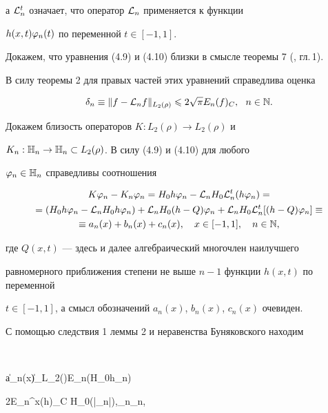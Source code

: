а ${\cal L}_n^t$ означает, что оператор ${\cal L}_n$ применяется к функции 


$h(x,t)\varphi_n(t)$ по переменной $t\in [-1,1]$.





Докажем, что уравнения (4.9) и (4.10) близки в смысле теоремы 7 (\cite{3}, гл.\,1). 


В силу теоремы 2 для правых частей этих уравнений справедлива оценка


\begin{equation}


\delta_n \equiv \|f-\rL_nf\|_{L_2(\rho)}\lea 2\sqrt{\pi}E_n(f)_C,\ \ n\in\N.


\end{equation}


Докажем близость операторов $K:L_2(\rho)\to L_2(\rho)$ и


$K_n:\Bbb{H}_n\to \Bbb{H}_n\subset L_2(\rho)$. В силу (4.9) и (4.10) для любого 


$\varphi_n\in \Bbb{H}_n$ справедливы соотношения


\begin{multline}


K\vp_n - K_n\vp_n=H_0h\vp_n - \rL_n H_0 \rL_n^t(h\vp_n)= \\


%


=(H_0h\vp_n - \rL_nH_0h\vp_n)+\rL_n H_0(h-Q)\vp_n+


\rL_n H_0\rL_n^t[(h-Q)\vp_n]\equiv \\


%


\equiv a_n(x)+b_n(x)+c_n(x),\quad x\in [-1,1],\quad n\in\N,


\end{multline}


где $Q(x,t)$ --- здесь и далее алгебраический многочлен наилучшего 


равномерного приближения степени не выше $n-1$ функции $h(x,t)$ по переменной 


$t\in [-1,1]$, а смысл обозначений $a_n(x)$, $b_n(x)$, $c_n(x)$ очевиден.





С помощью следствия 1 леммы 2 и неравенства Буняковского находим


$$


\|a_n(x)\|_{L_2(\rho)}\sqrt{\pi}E_n(H_0h\vp_n)\lea


2\sqrt{\pi}E_n^x(h)_C H_0(|\vp_n|),\quad \vp_n\in \bH_n,


